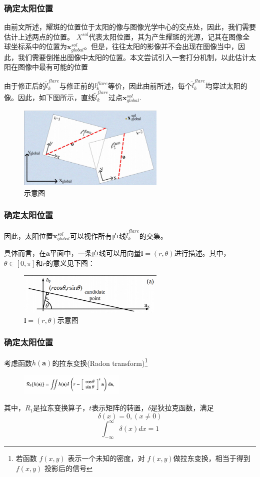 \documentclass{beamer}
\begin{document}
\begin{frame}
\frametitle{确定太阳位置}
由前文所述，耀斑的位置位于太阳的像与图像光学中心的交点处，因此，我们需要估计上述两点的位置。\pause
$X^{sol}$代表太阳位置，其为产生耀斑的光源，记其在图像全球坐标系中的位置为$\textbf{x}_{global}^{sol}$。但是，往往太阳的影像并不会出现在图像当中，因此，我们需要倒推出图像中太阳的位置。本文尝试引入一套打分机制，以此估计太阳在图像中最有可能的位置\pause

由于修正后的$\widetilde{l}_k^{flare}$与修正前的${l}_k^{flare}$等价，因此由前所述，每个$\widetilde{l}_k^{flare}$均穿过太阳的像。因此，如下图所示，直线$\widetilde{l}_k^{flare}$过点$\textbf{x}_{global}^{sol}$.
\begin{figure}[!h]
\centering
\includegraphics[height=4cm,width=7cm]{20221205.png}
\caption{示意图}
\end{figure}


\end{frame}
\begin{frame}
\frametitle{确定太阳位置}
因此，太阳位置$\textbf{x}_{global}^{sol}$可以视作所有直线$\widetilde{l}_k^{flare}$的交集。\pause

具体而言，在$\textbf{a}$平面中，一条直线可以用向量$\textbf{l}=(r,\theta)$进行描述。其中，$\theta\in[0,\pi]$和$r$的意义见下图：
\begin{figure}[!h]
\centering
\includegraphics[height=2cm,width=7cm]{2022120502.png}
\caption{$\textbf{l}=(r,\theta)$示意图}
\end{figure}
\end{frame}
\begin{frame}
\frametitle{确定太阳位置}
考虑函数$h(\textbf{a})$的拉东变换(Radon transform)\footnote{若函数 $f(x,y)$ 表示一个未知的密度，对 $f(x,y)$做拉东变换，相当于得到$f(x,y)$ 投影后的信号}

\begin{figure}[!h]
\centering
\includegraphics[height=1cm,width=5cm]{2022120503.png}
\end{figure}
其中，$R_1$是拉东变换算子，$t$表示矩阵的转置，$\delta$是狄拉克函数，满足
\begin{equation}
\delta(x)=0,(x\neq0)
\end{equation}
\begin{equation}
\int^{\infty}_{-\infty}\delta(x)dx=1
\end{equation}

\end{frame}
\end{document}

